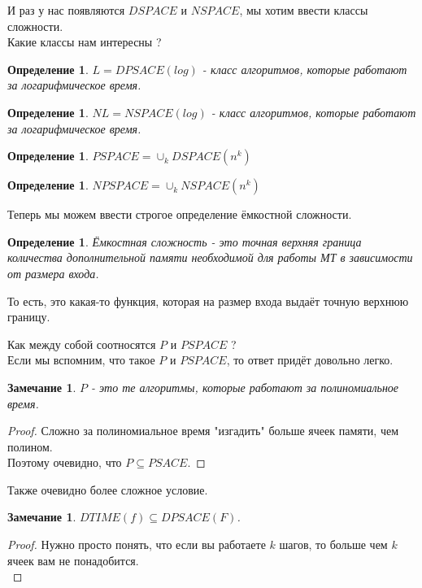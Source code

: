 \documentclass{beamer}
\theoremstyle{plain}
\newtheorem{rmk}[thm]{Замечание}
\newtheorem{dfn}[thm]{Определение}
\theoremstyle{definition}
\begin{document}
\begin{frame}
    И раз у нас появляются $DSPACE$ и $NSPACE$, мы хотим ввести классы сложности. \\
    Какие классы нам интересны ?
    \begin{dfn}
        $L = DPSACE(log)$ - класс алгоритмов, которые работают за логарифмическое
        время.
    \end{dfn}
    \begin{dfn}
        $NL = NSPACE(log)$ - класс алгоритмов, которые работают за логарифмическое
        время.
    \end{dfn}
    \begin{dfn}
        $PSPACE = \cup_k DSPACE(n^k)$
    \end{dfn}
    \begin{dfn}
        $NPSPACE = \cup_k NSPACE(n^k)$
    \end{dfn}
\end{frame}

\begin{frame}
    Теперь мы можем ввести строгое определение ёмкостной сложности.
    \begin{dfn}
        Ёмкостная сложность - это точная верхняя граница количества дополнительной
        памяти необходимой для работы МТ в зависимости от размера входа.
    \end{dfn}
    То есть, это какая-то функция, которая на размер входа выдаёт точную верхнюю границу.
\end{frame}

\begin{frame}
    Как между собой соотносятся $P$ и $PSPACE$ ? \\
    Если мы вспомним, что такое $P$ и $PSPACE$, то ответ придёт довольно легко.
    \begin{rmk}
        $P$ - это те алгоритмы, которые работают за полиномиальное время. \\
    \end{rmk}
    \begin{proof}
        Сложно за полиномиальное время "изгадить" больше ячеек памяти, чем полином. \\
        Поэтому очевидно, что $P \subseteq PSACE$.
    \end{proof}
\end{frame}

\begin{frame}
    Также очевидно более сложное условие.
    \begin{rmk}
        $DTIME(f) \subseteq DPSACE(F)$.
    \end{rmk}
    \begin{proof}
        Нужно просто понять, что если вы работаете $k$ шагов, то больше чем $k$ ячеек
        вам не понадобится. \\
    \end{proof}
\end{frame}
\end{document}
